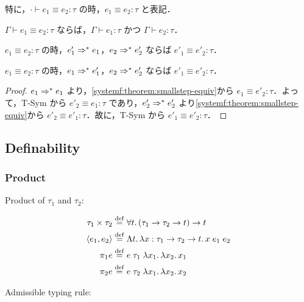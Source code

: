 特に，$\cdot \vdash e_1 \equiv e_2: \tau$ の時，$e_1 \equiv e_2: \tau$ と表記．

\begin{theorem}
  $\Gamma \vdash e_1 \equiv e_2: \tau$ ならば，$\Gamma \vdash e_1: \tau$ かつ $\Gamma \vdash e_2: \tau$．
\end{theorem}

\begin{theorem}
  \label{systemf:theorem:smallstep-equiv}
  $e_1 \equiv e_2: \tau$ の時，$e'_1 \Rightarrow^* e_1$，$e_2 \Rightarrow^* e'_2$ ならば $e'_1 \equiv e'_2: \tau$．
\end{theorem}

\begin{corollary}
  $e_1 \equiv e_2: \tau$ の時，$e_1 \Rightarrow^* e'_1$，$e_2 \Rightarrow^* e'_2$ ならば $e'_1 \equiv e'_2: \tau$．
\end{corollary}
\begin{proof}
  $e_1 \Rightarrow^* e_1$ より，\cref{systemf:theorem:smallstep-equiv}から $e_1 \equiv e'_2: \tau$．よって，T-Sym から $e'_2 \equiv e_1: \tau$ であり，$e'_2 \Rightarrow^* e'_2$ より\cref{systemf:theorem:smallstep-equiv}から $e'_2 \equiv e'_1: \tau$．故に，T-Sym から $e'_1 \equiv e'_2: \tau$．
\end{proof}

\subsection{Definability}

\subsubsection{Product}

Product of $\tau_1$ and $\tau_2$:

\begin{align*}
  \tau_1 \times \tau_2 &\mathrel{\overset{\mathrm{def}}{=}} \forall t\ldotp (\tau_1 \to \tau_2 \to t) \to t \\
  \langle e_1, e_2\rangle &\mathrel{\overset{\mathrm{def}}{=}} \Lambda t\ldotp \lambda x: \tau_1 \to \tau_2 \to t\ldotp x\; e_1\; e_2 \\
  \pi_1 e &\mathrel{\overset{\mathrm{def}}{=}} e\; \tau_1\; \lambda x_1\ldotp \lambda x_2\ldotp x_1 \\
  \pi_2 e &\mathrel{\overset{\mathrm{def}}{=}} e\; \tau_2\; \lambda x_1\ldotp \lambda x_2\ldotp x_2
\end{align*}

Admissible typing rule:

